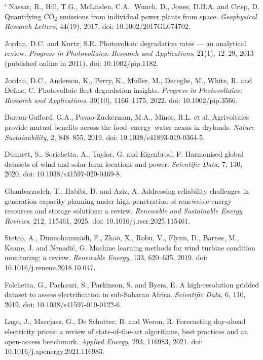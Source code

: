 \documentclass[10pt,a4paper,oneside]{book}
\makeatletter
\renewenvironment{thebibliography}[1]
  {\list{\@biblabel{\@arabic\c@enumiv}}%
     {\settowidth\labelwidth{\@biblabel{#1}}%
      \leftmargin\labelwidth \advance\leftmargin\labelsep
      \usecounter{enumiv}\let\p@enumiv\@empty
      \renewcommand\theenumiv{\@arabic\c@enumiv}}%
   \sloppy\clubpenalty4000 \@clubpenalty\clubpenalty
   \widowpenalty4000 \sfcode`\.\@m}
  {\endlist}
\makeatother
\begin{document}
\begin{landscape}
{\begin{thebibliography}{99}
 Nassar, R., Hill, T.G., McLinden, C.A., Wunch, D., Jones,
  D.B.A. and Crisp, D. Quantifying CO$_2$ emissions from individual power plants
  from space. \emph{Geophysical Research Letters}, 44(19), 2017.
  doi: 10.1002/2017GL074702.

 Jordan, D.C. and Kurtz, S.R. Photovoltaic degradation
  rates --- an analytical review. \emph{Progress in Photovoltaics: Research and
  Applications}, 21(1), 12--29, 2013 (published online in 2011).
  doi: 10.1002/pip.1182.

 Jordan, D.C., Anderson, K., Perry, K., Muller, M.,
  Deceglie, M., White, R. and Deline, C. Photovoltaic fleet degradation insights.
  \emph{Progress in Photovoltaics: Research and Applications}, 30(10),
  1166--1175, 2022. doi: 10.1002/pip.3566.

 Barron-Gafford, G.A., Pavao-Zuckerman, M.A., Minor,
  R.L. et al. Agrivoltaics provide mutual benefits across the food--energy--water
  nexus in drylands. \emph{Nature Sustainability}, 2, 848--855, 2019.
  doi: 10.1038/s41893-019-0364-5.

 Dunnett, S., Sorichetta, A., Taylor, G. and Eigenbrod, F.
  Harmonised global datasets of wind and solar farm locations and power.
  \emph{Scientific Data}, 7, 130, 2020. doi: 10.1038/s41597-020-0469-8.

 Ghanbarzadeh, T., Habibi, D. and Aziz, A. Addressing
  reliability challenges in generation capacity planning under high penetration
  of renewable energy resources and storage solutions: a review. \emph{Renewable
  and Sustainable Energy Reviews}, 212, 115461, 2025.
  doi: 10.1016/j.rser.2025.115461.

 Stetco, A., Dinmohammadi, F., Zhao, X., Robu, V., Flynn,
  D., Barnes, M., Keane, J. and Nenadi\'c, G. Machine learning methods for wind
  turbine condition monitoring: a review. \emph{Renewable Energy}, 133,
  620--635, 2019. doi: 10.1016/j.renene.2018.10.047.

 Falchetta, G., Pachauri, S., Parkinson, S. and Byers, E.
  A high-resolution gridded dataset to assess electrification in sub-Saharan
  Africa. \emph{Scientific Data}, 6, 110, 2019.
  doi: 10.1038/s41597-019-0122-6.

 Lago, J., Marcjasz, G., De Schutter, B. and Weron, R.
  Forecasting day-ahead electricity prices: a review of state-of-the-art
  algorithms, best practices and an open-access benchmark. \emph{Applied
  Energy}, 293, 116983, 2021. doi: 10.1016/j.apenergy.2021.116983.


\end{thebibliography}}
\end{landscape}
\end{document}
